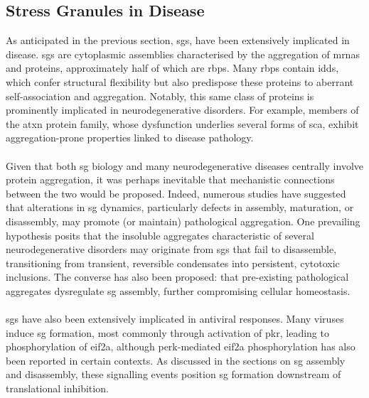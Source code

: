 \subsection{Stress Granules in Disease}

As anticipated in the previous section, \glspl{sg}, have been extensively implicated in disease. \glspl{sg} are cytoplasmic assemblies characterised by the aggregation of \glspl{mrna} and proteins, approximately half of which are \glspl{rbp}\cite{nunes_msgp_2019}. Many \glspl{rbp} contain \glspl{idd}\cite{wear_proteins_2015, marcelo_stress_2021}, which confer structural flexibility but also predispose these proteins to aberrant self-association and aggregation\cite{wear_proteins_2015, marcelo_stress_2021}. Notably, this same class of proteins is prominently implicated in neurodegenerative disorders\cite{marcelo_stress_2021}. For example, members of the \gls{atxn} protein family, whose dysfunction underlies several forms of \gls{sca}, exhibit aggregation-prone properties linked to disease pathology\cite{bevivino_expanded_2001, elden_ataxin-2_2010}.
\\
\\
Given that both \gls{sg} biology and many neurodegenerative diseases centrally involve protein aggregation, it was perhaps inevitable that mechanistic connections between the two would be proposed. Indeed, numerous studies have suggested that alterations in \gls{sg} dynamics, particularly defects in assembly, maturation, or disassembly, may promote (or maintain) pathological aggregation\cite{mackenzie_tia1_2017}. One prevailing hypothesis posits that the insoluble aggregates characteristic of several neurodegenerative disorders may originate from \glspl{sg} that fail to disassemble, transitioning from transient, reversible condensates into persistent, cytotoxic inclusions\cite{dobra_relation_2018, wolozin_stress_2019, marcelo_stress_2021, wang_targeting_2020}. The converse has also been proposed: that pre-existing pathological aggregates dysregulate \gls{sg} assembly, further compromising cellular homeostasis\cite{dobra_relation_2018, wolozin_stress_2019, marcelo_stress_2021, wang_targeting_2020}.
\\
\\
\glspl{sg} have also been extensively implicated in antiviral responses\cite{guan_multiple_2023}. Many viruses induce \gls{sg} formation, most commonly through activation of \gls{pkr}\cite{guan_multiple_2023, lindquist_activation_2011, choi_polyhexamethylene_2022}, leading to phosphorylation of \gls{eif2a}, although \gls{perk}-mediated \gls{eif2a} phosphorylation has also been reported in certain contexts\cite{guan_multiple_2023, zhou_porcine_2017}. As discussed in the sections on \gls{sg} assembly and disassembly, these signalling events position \gls{sg} formation downstream of translational inhibition.
